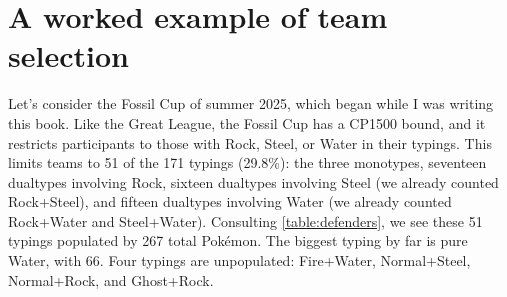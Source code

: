 \chapter{A worked example of team selection}
\label{chap:example}

Let's consider the Fossil Cup of summer 2025, which began while I was writing this book.
Like the Great League, the Fossil Cup has a CP1500 bound, and it
  restricts participants to those with Rock, Steel, or Water in their typings.
This limits teams to 51 of the 171 typings (29.8\%): the three monotypes, seventeen dualtypes
 involving Rock, sixteen dualtypes involving Steel (we already counted Rock+Steel), and
 fifteen dualtypes involving Water (we already counted Rock+Water and Steel+Water).
Consulting \autoref{table:defenders}, we see these 51 typings populated by 267 total Pokémon.
The biggest typing by far is pure Water, with 66.
Four typings are unpopulated: Fire+Water, Normal+Steel, Normal+Rock, and Ghost+Rock.
